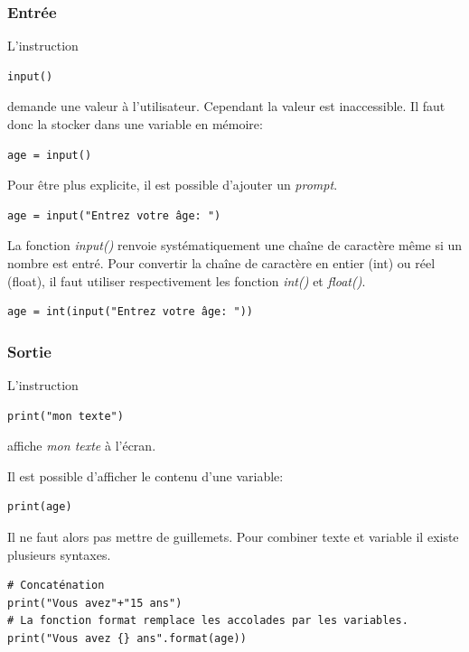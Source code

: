 \documentclass[a4paper,11pt]{article}
\begin{document}
\begin{Form}
\subsubsection{Entrée}
L'instruction
\begin{lstlisting}
input()
\end{lstlisting}
demande une valeur à l'utilisateur. Cependant la valeur est inaccessible. Il faut donc la stocker dans une variable en mémoire:
\begin{lstlisting}
age = input()
\end{lstlisting}
Pour être plus explicite, il est possible d'ajouter un \emph{prompt}.
\begin{lstlisting}
age = input("Entrez votre âge: ")
\end{lstlisting}
\begin{aretenir}
La fonction \emph{input()} renvoie systématiquement une chaîne de caractère même si un nombre est entré. Pour convertir la chaîne de caractère en entier (int) ou réel (float), il faut utiliser respectivement les fonction \emph{int()} et \emph{float()}.
\begin{lstlisting}
age = int(input("Entrez votre âge: "))
\end{lstlisting}
\end{aretenir}
\subsubsection{Sortie}
L'instruction
\begin{lstlisting}
print("mon texte")
\end{lstlisting}
affiche \emph{mon texte} à l'écran. 

Il est possible d'afficher le contenu d'une variable:
\begin{lstlisting}
print(age)
\end{lstlisting}
Il ne faut alors pas mettre de guillemets.
Pour combiner texte et variable il existe plusieurs syntaxes.
\begin{code}[!h]
\begin{lstlisting}
# Concaténation
print("Vous avez"+"15 ans")
# La fonction format remplace les accolades par les variables.
print("Vous avez {} ans".format(age))


\end{lstlisting}
\end{code}
\end{Form}
\end{document}
